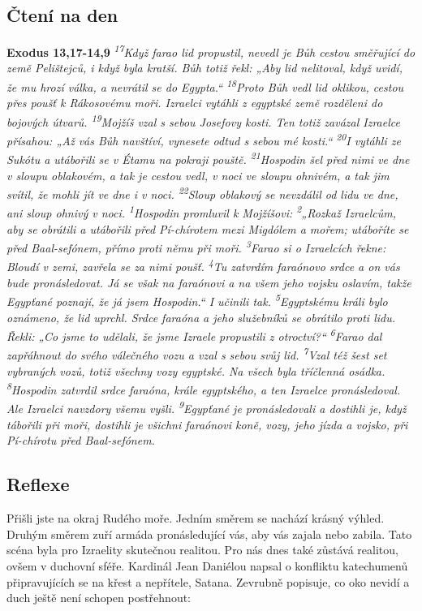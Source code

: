 \documentclass[11pt]{article}
\begin{document}
\subsection*{Čtení na den}
\textbf{Exodus 13,17-14,9}
\newline
\textit{
\textsuperscript{17}Když farao lid propustil, nevedl je Bůh cestou směřující do země Pelištejců, i když byla kratší. Bůh totiž řekl: „Aby lid nelitoval, když uvidí, že mu hrozí válka, a nevrátil se do Egypta.“
\textsuperscript{18}Proto Bůh vedl lid oklikou, cestou přes poušť k Rákosovému moři. Izraelci vytáhli z egyptské země rozděleni do bojových útvarů.
\textsuperscript{19}Mojžíš vzal s sebou Josefovy kosti. Ten totiž zavázal Izraelce přísahou: „Až vás Bůh navštíví, vynesete odtud s sebou mé kosti.“
\textsuperscript{20}I vytáhli ze Sukótu a utábořili se v Étamu na pokraji pouště.
\textsuperscript{21}Hospodin šel před nimi ve dne v sloupu oblakovém, a tak je cestou vedl, v noci ve sloupu ohnivém, a tak jim svítil, že mohli jít ve dne i v noci.
\textsuperscript{22}Sloup oblakový se nevzdálil od lidu ve dne, ani sloup ohnivý v noci.
\textsuperscript{1}Hospodin promluvil k Mojžíšovi:
\textsuperscript{2}„Rozkaž Izraelcům, aby se obrátili a utábořili před Pí-chírotem mezi Migdólem a mořem; utáboříte se před Baal-sefónem, přímo proti němu při moři.
\textsuperscript{3}Farao si o Izraelcích řekne: Bloudí v zemi, zavřela se za nimi poušť.
\textsuperscript{4}Tu zatvrdím faraónovo srdce a on vás bude pronásledovat. Já se však na faraónovi a na všem jeho vojsku oslavím, takže Egypťané poznají, že já jsem Hospodin.“ I učinili tak.
\textsuperscript{5}Egyptskému králi bylo oznámeno, že lid uprchl. Srdce faraóna a jeho služebníků se obrátilo proti lidu. Řekli: „Co jsme to udělali, že jsme Izraele propustili z otroctví?“
\textsuperscript{6}Farao dal zapřáhnout do svého válečného vozu a vzal s sebou svůj lid.
\textsuperscript{7}Vzal též šest set vybraných vozů, totiž všechny vozy egyptské. Na všech byla tříčlenná osádka.
\textsuperscript{8}Hospodin zatvrdil srdce faraóna, krále egyptského, a ten Izraelce pronásledoval. Ale Izraelci navzdory všemu vyšli.
\textsuperscript{9}Egypťané je pronásledovali a dostihli je, když tábořili při moři, dostihli je všichni faraónovi koně, vozy, jeho jízda a vojsko, při Pí-chírotu před Baal-sefónem.
}

\subsection*{Reflexe}
Přišli jste na okraj Rudého moře. Jedním směrem se nachází krásný výhled. Druhým směrem zuří armáda
pronásledující vás, aby vás zajala nebo zabila. Tato scéna byla pro Izraelity skutečnou realitou. Pro nás dnes
také zůstává realitou, ovšem v duchovní sféře.
Kardinál Jean Daniélou napsal o konfliktu katechumenů připravujících se na křest a nepřítele, Satana.
Zevrubně popisuje, co oko nevidí a duch ještě není schopen postřehnout:
\end{document}
